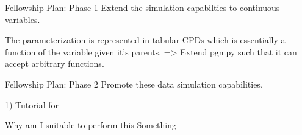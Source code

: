 \documentclass{beamer}
\begin{document}
\begin{frame}{Fellowship Plan: Phase 1}
	Extend the simulation capabilties to continuous variables.


	The parameterization is represented in tabular CPDs which is essentially a function of the variable given it's parents. => Extend pgmpy such that it can accept arbitrary functions.
\end{frame}

\begin{frame}{Fellowship Plan: Phase 2}
	Promote these data simulation capabilities.

	1) Tutorial for 
\end{frame}

\begin{frame}{Why am I suitable to perform this}
	Something
\end{frame}
\end{document}
